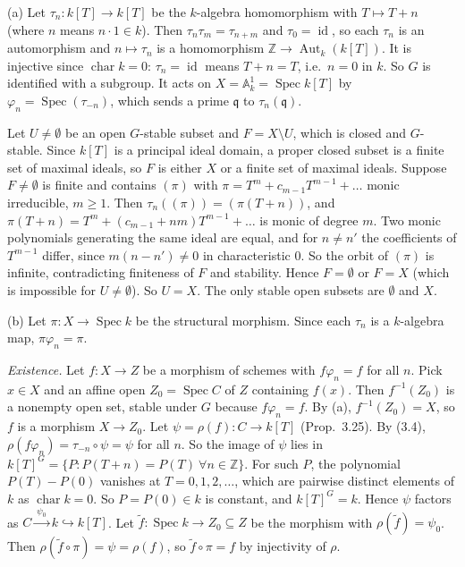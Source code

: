 \documentclass[11pt]{article}
\begin{document}
(a) Let $\tau_n:k[T]\to k[T]$ be the $k$-algebra homomorphism with $T\mapsto T+n$ (where $n$ means $n\cdot1\in k$). Then $\tau_n\tau_m=\tau_{n+m}$ and $\tau_0=\operatorname{id}$, so each $\tau_n$ is an automorphism and $n\mapsto\tau_n$ is a homomorphism $\mathbb{Z}\to\operatorname{Aut}_k(k[T])$. It is injective since $\operatorname{char}k=0$: $\tau_n=\operatorname{id}$ means $T+n=T$, i.e.\ $n=0$ in $k$. So $G$ is identified with a subgroup. It acts on $X=\mathbb{A}^1_k=\operatorname{Spec}k[T]$ by $\varphi_n=\operatorname{Spec}(\tau_{-n})$, which sends a prime $\mathfrak q$ to $\tau_n(\mathfrak q)$.

Let $U\ne\emptyset$ be an open $G$-stable subset and $F=X\setminus U$, which is closed and $G$-stable. Since $k[T]$ is a principal ideal domain, a proper closed subset is a finite set of maximal ideals, so $F$ is either $X$ or a finite set of maximal ideals. Suppose $F\ne\emptyset$ is finite and contains $(\pi)$ with $\pi=T^m+c_{m-1}T^{m-1}+\dots$ monic irreducible, $m\ge1$. Then $\tau_n((\pi))=(\pi(T+n))$, and $\pi(T+n)=T^m+(c_{m-1}+nm)T^{m-1}+\dots$ is monic of degree $m$. Two monic polynomials generating the same ideal are equal, and for $n\ne n'$ the coefficients of $T^{m-1}$ differ, since $m(n-n')\ne0$ in characteristic $0$. So the orbit of $(\pi)$ is infinite, contradicting finiteness of $F$ and stability. Hence $F=\emptyset$ or $F=X$ (which is impossible for $U\neq\emptyset$). So $U=X$. The only stable open subsets are $\emptyset$ and $X$.

(b) Let $\pi:X\to\operatorname{Spec}k$ be the structural morphism. Since each $\tau_n$ is a $k$-algebra map, $\pi\varphi_n=\pi$.

\emph{Existence.} Let $f:X\to Z$ be a morphism of schemes with $f\varphi_n=f$ for all $n$. Pick $x\in X$ and an affine open $Z_0=\operatorname{Spec}C$ of $Z$ containing $f(x)$. Then $f^{-1}(Z_0)$ is a nonempty open set, stable under $G$ because $f\varphi_n=f$. By (a), $f^{-1}(Z_0)=X$, so $f$ is a morphism $X\to Z_0$. Let $\psi=\rho(f):C\to k[T]$ (Prop.~3.25). By (3.4), $\rho(f\varphi_n)=\tau_{-n}\circ\psi=\psi$ for all $n$. So the image of $\psi$ lies in $k[T]^G=\{P:P(T+n)=P(T)\ \forall n\in\mathbb{Z}\}$. For such $P$, the polynomial $P(T)-P(0)$ vanishes at $T=0,1,2,\dots$, which are pairwise distinct elements of $k$ as $\operatorname{char}k=0$. So $P=P(0)\in k$ is constant, and $k[T]^G=k$. Hence $\psi$ factors as $C\xrightarrow{\ \psi_0\ }k\hookrightarrow k[T]$. Let $\tilde f:\operatorname{Spec}k\to Z_0\subseteq Z$ be the morphism with $\rho(\tilde f)=\psi_0$. Then $\rho(\tilde f\circ\pi)=\psi=\rho(f)$, so $\tilde f\circ\pi=f$ by injectivity of $\rho$.
\end{document}

